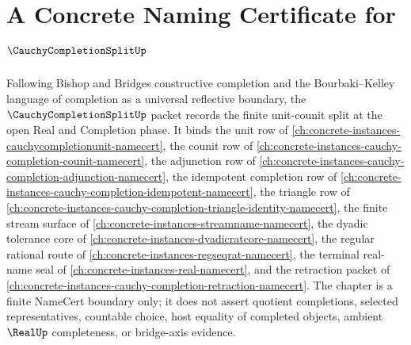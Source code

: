 \chapter{A Concrete Naming Certificate for $\CauchyCompletionSplitUp$}
\label{ch:concrete-instances-cauchy-completion-split-namecert}

Following Bishop and Bridges constructive completion and the Bourbaki--Kelley language of completion as a universal reflective boundary, the $\CauchyCompletionSplitUp$ packet records the finite unit-counit split at the open Real and Completion phase. It binds the unit row of \autoref{ch:concrete-instances-cauchycompletionunit-namecert}, the counit row of \autoref{ch:concrete-instances-cauchy-completion-counit-namecert}, the adjunction row of \autoref{ch:concrete-instances-cauchy-completion-adjunction-namecert}, the idempotent completion row of \autoref{ch:concrete-instances-cauchy-completion-idempotent-namecert}, the triangle row of \autoref{ch:concrete-instances-cauchy-completion-triangle-identity-namecert}, the finite stream surface of \autoref{ch:concrete-instances-streamname-namecert}, the dyadic tolerance core of \autoref{ch:concrete-instances-dyadicratcore-namecert}, the regular rational route of \autoref{ch:concrete-instances-regseqrat-namecert}, the terminal real-name seal of \autoref{ch:concrete-instances-real-namecert}, and the retraction packet of \autoref{ch:concrete-instances-cauchy-completion-retraction-namecert}. The chapter is a finite NameCert boundary only; it does not assert quotient completions, selected representatives, countable choice, host equality of completed objects, ambient $\RealUp$ completeness, or bridge-axis evidence.

